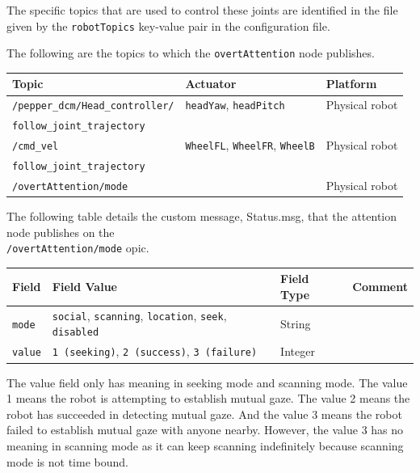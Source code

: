 \documentclass{CSSRforAfrica}
\begin{document}
{{The specific topics that are used to control these joints   are  identified in the file given by the {\small \verb+robotTopics+ }   key-value pair in the configuration file.

The following are the topics to which the {\small \verb+overtAttention+} node publishes.
 
\begin{center}
\begin{tabularx}{\linewidth}{| l | l | X|}
\hline 
{\small Topic }                                                                                & {\small Actuator }    &  {\small Platform}       \\
\hline
{\footnotesize \verb+/pepper_dcm/Head_controller/+ }  & {\footnotesize \verb+headYaw+,   \verb+headPitch+ } & {\small Physical robot} \\ 
{\footnotesize \verb+follow_joint_trajectory+ }                &                                                                                      &  \\ 
\hline
{\footnotesize \verb+/cmd_vel+ }                                               &    {\footnotesize \verb+WheelFL+},  {\footnotesize \verb+WheelFR+},   {\footnotesize \verb+WheelB+} & {\small Physical robot} \\ 
{\footnotesize \verb+follow_joint_trajectory+ }         &                                                                                      &  \\ 
\hline
{\footnotesize \verb+/overtAttention/mode+ }                                &   & {\small Physical robot} \\ 
\hline
\end{tabularx}
\end{center}

The following table details the custom message, Status.msg, that the attention node publishes on the\\ {\footnotesize \verb+/overtAttention/mode+} opic.

\begin{center}
	\begin{tabularx}{\linewidth}{| l | X | l| l|}
		\hline 
		{\small Field }                                  & {\small Field Value}    &  {\small Field Type}  &     {\small Comment}   \\
		\hline
		{\footnotesize  \verb+mode+}          & {\footnotesize \verb+social+,  \verb+scanning+, \verb+location+, \verb+seek+, \verb+disabled+ } & {\footnotesize String} & \\ 
		\hline
		{\footnotesize  \verb+value+}  & {\footnotesize \verb+1 (seeking)+, \verb+2 (success)+, \verb+3 (failure)+    } & {\footnotesize Integer} & \\ 
		\hline
	\end{tabularx}
\end{center}
The value field only has meaning in seeking mode and scanning mode. The value 1 means the robot is attempting to establish mutual gaze. The value 2 means the robot has succeeded in detecting mutual gaze. And the value 3 means the robot failed to establish mutual gaze with anyone nearby. However, the value 3 has no meaning in scanning mode as it can keep scanning indefinitely because scanning mode is not time bound.

}}
\end{document}
